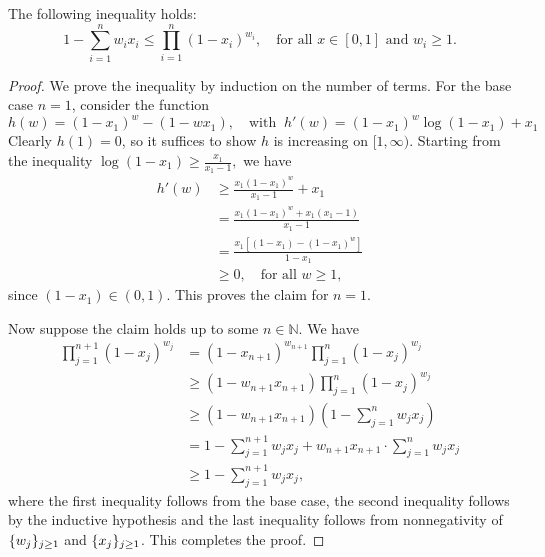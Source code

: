 \begin{theorem}[Weierstrass]
	\label{thm:weierstrass}
	The following inequality holds:
	\begin{equation}
		1 - \sum_{i=1}^n w_{i} x_i \leq \prod_{i = 1}^n \left(1 - x_i\right)^{w_i}, \quad
		\text{for all $x \in [0, 1]$ and $w_i \geq 1$}.
		\label{eq:weierstrass}
	\end{equation}
\end{theorem}
\begin{proof}
    We prove the inequality by induction on the number of
    terms. For the base case $n = 1$, consider the function
    \[
        h(w) = (1 - x_1)^w - (1 - w x_1), \quad
        \text{with} \;\;
        h'(w) = (1 - x_1)^{w} \log(1 - x_1) + x_1
    \]
    Clearly $h(1) = 0$, so it suffices to show $h$ is increasing on $[1, \infty)$. Starting from the inequality
    \(
        \log(1 - x_1) \geq \frac{x_1}{x_1 - 1},
    \)
    we have
    \begin{align*}
        h'(w) &\geq
        \frac{x_1 (1 - x_1)^{w}}{x_1 - 1} + x_1 \\
        &=
        \frac{x_1 (1 - x_1)^{w} + x_1 (x_1 - 1)}{x_1 - 1} \\
        &=
        \frac{x_1 \left[(1 - x_1) - (1 - x_1)^w\right]}{1 - x_1} \\
        &\geq 0, \quad \text{for all $w \geq 1$,}
    \end{align*}
    since $(1 - x_1) \in (0, 1)$. This proves the claim
    for $n = 1$.

    Now suppose the claim holds up to some $n \in \mathbb{N}$. We have
    \begin{align*}
        \prod_{j = 1}^{n+1} (1 - x_j)^{w_j} &=
        (1 - x_{n+1})^{w_{n+1}} \prod_{j = 1}^n (1 - x_j)^{w_j} \\
        &\geq
        (1 - w_{n+1} x_{n+1}) \prod_{j = 1}^{n}
        (1 - x_j)^{w_j} \\
        &\geq
        (1 - w_{n+1} x_{n+1}) \left(1 - \sum_{j = 1}^n w_j x_j \right) \\
        &=
        1 - \sum_{j = 1}^{n+1} w_j x_j +
        w_{n+1} x_{n+1} \cdot \sum_{j = 1}^{n} w_j x_j \\
        &\geq
        1 - \sum_{j = 1}^{n+1} w_j x_j,
    \end{align*}
    where the first inequality follows from the base
    case, the second inequality follows by the inductive
    hypothesis and the last inequality follows from
    nonnegativity of $\{w_j\}_{j \geq 1}$ and $\{x_j\}_{j \geq 1}$. This completes the proof.
\end{proof}

